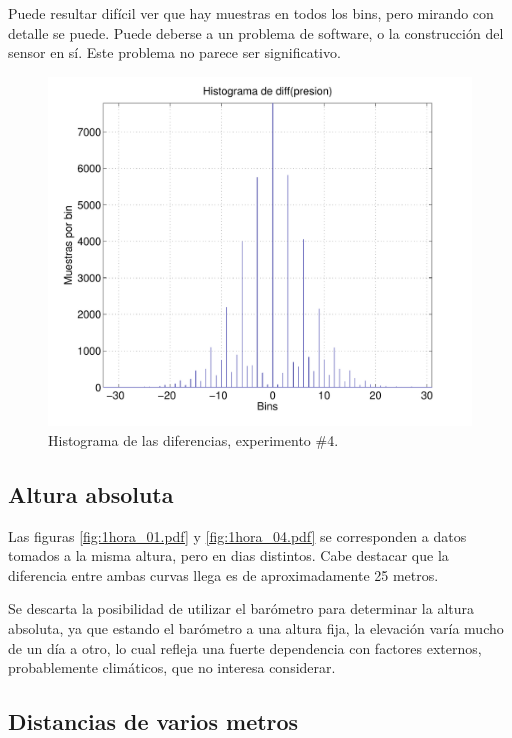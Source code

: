 \documentclass[main]{subfiles}
\begin{document}
Puede resultar difícil ver que hay muestras en todos los bins, pero mirando con detalle se puede. Puede deberse a un problema de software, o la construcción del sensor en sí. Este problema no parece ser significativo.
\vspace{-14pt}
\begin{figure}[h!]
\centering
  \includegraphics[width=.75\textwidth]{./pics_barom/barom_hist_exp4.pdf}
\vspace{-15pt}
  \caption{Histograma de las diferencias, experimento \#4.}
  \label{fig:barom_hist_exp4.pdf}
\end{figure}
\vspace{-40pt}


\newpage
\subsection{Altura absoluta}

Las figuras \ref{fig:1hora_01.pdf} y \ref{fig:1hora_04.pdf} se corresponden a datos tomados a la misma altura, pero en dias distintos. Cabe destacar que la diferencia entre ambas curvas llega es de aproximadamente 25 metros.

Se descarta la posibilidad de utilizar el barómetro para determinar la altura absoluta, ya que estando el barómetro a una altura fija, la elevación varía mucho de un día a otro, lo cual refleja una fuerte dependencia con factores externos, probablemente climáticos, que no interesa considerar.

\subsection{Distancias de varios metros}
\end{document}
